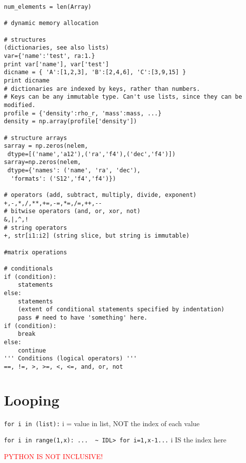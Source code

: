 \documentclass{article}
\begin{document}
\begin{verbatim}
num_elements = len(Array)

# dynamic memory allocation

# structures
(dictionaries, see also lists)
var={'name':'test', ra:1.}
print var['name'], var['test']
dicname = { 'A':[1,2,3], 'B':[2,4,6], 'C':[3,9,15] }
print dicname
# dictionaries are indexed by keys, rather than numbers.
# Keys can be any immutable type. Can't use lists, since they can be modified.
profile = {'density':rho_r, 'mass':mass, ...}
density = np.array(profile['density'])

# structure arrays
sarray = np.zeros(nelem,
 dtype=[('name','a12'),('ra','f4'),('dec','f4')])
sarray=np.zeros(nelem,
 dtype={'names': ('name', 'ra', 'dec'),
  'formats': ('S12','f4','f4')})

# operators (add, subtract, multiply, divide, exponent)
+,-,*,/,**,+=,-=,*=,/=,++,--
# bitwise operators (and, or, xor, not)
&,|,^,!
# string operators
+, str[i1:i2] (string slice, but string is immutable)

#matrix operations

# conditionals
if (condition):
    statements
else:
    statements
    (extent of conditional statements specified by indentation)
    pass # need to have 'something' here.
if (condition):
    break
else:
    continue
''' Conditions (logical operators) '''
==, !=, >, >=, <, <=, and, or, not
\end{verbatim}

\section*{Looping}
\verb|for i in (list):| i = value in list, NOT the index of each value

\verb|for i in range(1,x): ...  ~ IDL> for i=1,x-1...| i IS the index here

\textcolor{red}{PYTHON IS NOT INCLUSIVE!}
\end{document}

